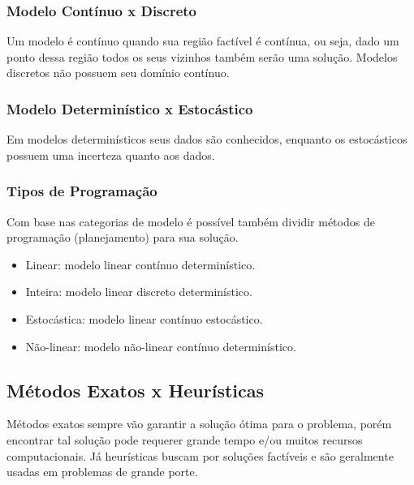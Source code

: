 \subsubsection{Modelo Contínuo x Discreto}\label{subsubsec:modelo-continuo-x-discreto}

Um modelo é contínuo quando sua região factível é contínua, ou seja, dado um ponto dessa região todos os seus vizinhos também serão uma solução.
Modelos discretos não possuem seu domínio contínuo.

\subsubsection{Modelo Determinístico x Estocástico}\label{subsubsec:modelo-deterministico-x-estocastico}

Em modelos determinísticos seus dados são conhecidos, enquanto os estocásticos possuem uma incerteza quanto aos dados.

\subsubsection{Tipos de Programação}\label{subsubsec:tipos-de-programacao}

Com base nas categorias de modelo é possível também dividir métodos de programação (planejamento) para sua solução.

\begin{itemize}
    \item Linear: modelo linear contínuo determinístico.
    \item Inteira: modelo linear discreto determinístico.
    \item Estocástica: modelo linear contínuo estocástico.
    \item Não-linear: modelo não-linear contínuo determinístico.
\end{itemize}

\subsection{Métodos Exatos x Heurísticas}\label{subsec:metodos-exatos-x-heuristicas}

Métodos exatos sempre vão garantir a solução ótima para o problema, porém encontrar tal solução pode requerer grande tempo e/ou muitos recursos computacionais.
Já heurísticas buscam por soluções factíveis e são geralmente usadas em problemas de grande porte.

